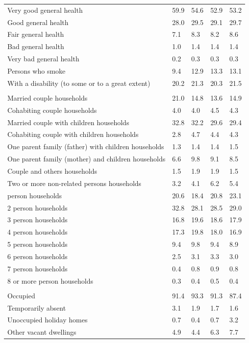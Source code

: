 \documentclass{article}
\begin{document}
\begin{table}[h]
\begin{tabular}{KTTTT}
    \hline
Very good general health & 59.9& 54.6&52.9& 53.2\\
Good general health & 28.0& 29.5& 29.1& 29.7\\
Fair general health & 7.1& 8.3&8.2& 8.6\\
Bad general health & 1.0& 1.4&1.4& 1.4\\
Very bad general health & 0.2& 0.3&0.3& 0.3\\
    \hline
Persons who smoke &  9.4& 12.9&13.3& 13.1\\
    \hline
With a disability (to some or to a great extent) & 20.2& 21.3&20.3& 21.5\\
\hline
    \\ 
    \hline
Married couple households & 21.0& 14.8& 13.6& 14.9\\
Cohabiting couple households & 4.0& 4.0& 4.5& 4.3\\
Married couple with children households & 32.8& 32.2& 29.6& 29.4\\
Cohabiting couple with children households & 2.8& 4.7& 4.4& 4.3\\
One parent family (father) with  children households & 1.3& 1.4& 1.4& 1.5\\
One parent family (mother) and children households & 6.6& 9.8& 9.1& 8.5\\
Couple and others households  & 1.5& 1.9& 1.9& 1.5\\
Two or more non-related persons households & 3.2& 4.1& 6.2& 5.4\\
     person households & 20.6& 18.4& 20.8& 23.1\\
2 person households & 32.8& 28.1& 28.5& 29.0\\
3 person households & 16.8& 19.6& 18.6& 17.9\\
4 person households & 17.3& 19.8& 18.0& 16.9\\
5 person households & 9.4& 9.8& 9.4& 8.9\\
6 person households & 2.5& 3.1& 3.3& 3.0\\
7 person households & 0.4& 0.8& 0.9& 0.8\\
8 or more person households & 0.3& 0.4& 0.5& 0.4\\
\hline
    \\ 
    \hline
Occupied & 91.4& 93.3& 91.3& 87.4\\
Temporarily absent & 3.1& 1.9& 1.7& 1.6\\
Unoccupied holiday homes & 0.7& 0.4& 0.7& 3.2\\
Other vacant dwellings & 4.9& 4.4& 6.3& 7.7\\
\hline
\end{tabular}
\end{table}
\end{document}
